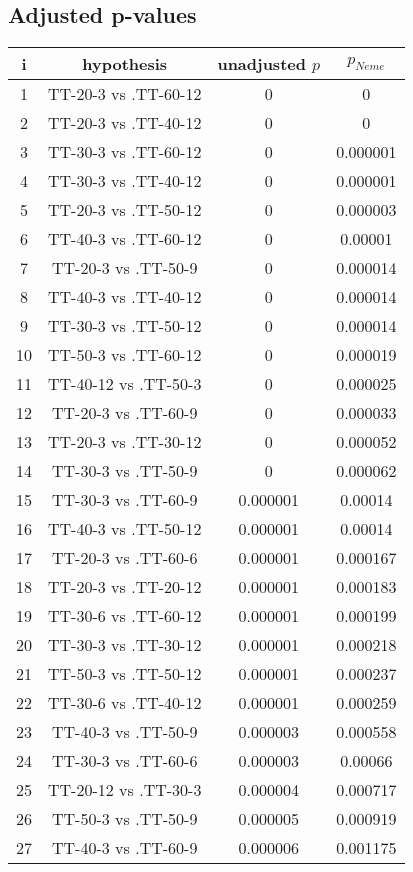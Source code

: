 \documentclass[a4paper,10pt]{article}
\begin{document}
\begin{landscape}
\pagebreak

\subsection{Adjusted p-values}

\begin{table}[!htp]
\centering\scriptsize
\begin{tabular}{cccc}
i&hypothesis&unadjusted $p$&$p_{Neme}$\\
\hline1&TT-20-3 vs .TT-60-12&0&0\\
2&TT-20-3 vs .TT-40-12&0&0\\
3&TT-30-3 vs .TT-60-12&0&0.000001\\
4&TT-30-3 vs .TT-40-12&0&0.000001\\
5&TT-20-3 vs .TT-50-12&0&0.000003\\
6&TT-40-3 vs .TT-60-12&0&0.00001\\
7&TT-20-3 vs .TT-50-9&0&0.000014\\
8&TT-40-3 vs .TT-40-12&0&0.000014\\
9&TT-30-3 vs .TT-50-12&0&0.000014\\
10&TT-50-3 vs .TT-60-12&0&0.000019\\
11&TT-40-12 vs .TT-50-3&0&0.000025\\
12&TT-20-3 vs .TT-60-9&0&0.000033\\
13&TT-20-3 vs .TT-30-12&0&0.000052\\
14&TT-30-3 vs .TT-50-9&0&0.000062\\
15&TT-30-3 vs .TT-60-9&0.000001&0.00014\\
16&TT-40-3 vs .TT-50-12&0.000001&0.00014\\
17&TT-20-3 vs .TT-60-6&0.000001&0.000167\\
18&TT-20-3 vs .TT-20-12&0.000001&0.000183\\
19&TT-30-6 vs .TT-60-12&0.000001&0.000199\\
20&TT-30-3 vs .TT-30-12&0.000001&0.000218\\
21&TT-50-3 vs .TT-50-12&0.000001&0.000237\\
22&TT-30-6 vs .TT-40-12&0.000001&0.000259\\
23&TT-40-3 vs .TT-50-9&0.000003&0.000558\\
24&TT-30-3 vs .TT-60-6&0.000003&0.00066\\
25&TT-20-12 vs .TT-30-3&0.000004&0.000717\\
26&TT-50-3 vs .TT-50-9&0.000005&0.000919\\
27&TT-40-3 vs .TT-60-9&0.000006&0.001175\\

\end{tabular}
\end{table}
\end{landscape}
\end{document}
